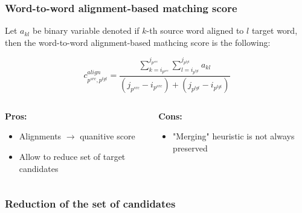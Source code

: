 \documentclass{beamer}
\newcommand{\src}[1]{#1^{src}}
\newcommand{\tgt}[1]{#1^{tgt}}
\begin{document}
\begin{frame}
  \frametitle{Word-to-word alignment-based matching score}

  Let \( a_{kl} \) be binary variable denoted if \( k \)-th source word aligned to \( l \) target word,
  then the word-to-word alignment-based mathcing score is the following:

  \begin{equation*}
    c_{\src{p}, \tgt{p}}^{align} =
    \frac{\sum\limits_{k=i_{\src{p}}}^{j_{\src{p}}} \sum\limits_{l=i_{\tgt{p}}}^{j_{\tgt{p}}} a_{kl}}
    {(j_{\src{p}} - i_{\src{p}}) + (j_{\tgt{p}} - i_{\tgt{p}})}
  \end{equation*}

  \vspace*{0.2cm}
  \begin{columns}
    \begin{column}[t]{.5\textwidth}
      \centering \textbf{Pros:}
      \begin{itemize}
        \item Alignments \( \rightarrow \) quanitive score
        \item Allow to reduce set of target candidates
      \end{itemize}
    \end{column}
    \begin{column}[t]{.5\textwidth}
      \centering \textbf{Cons:}
      \begin{itemize}
        \item "Merging" heuristic is not always preserved
      \end{itemize}
    \end{column}
  \end{columns}
\end{frame}

\begin{frame}
  \frametitle{Reduction of the set of candidates}
\end{frame}
\end{document}
